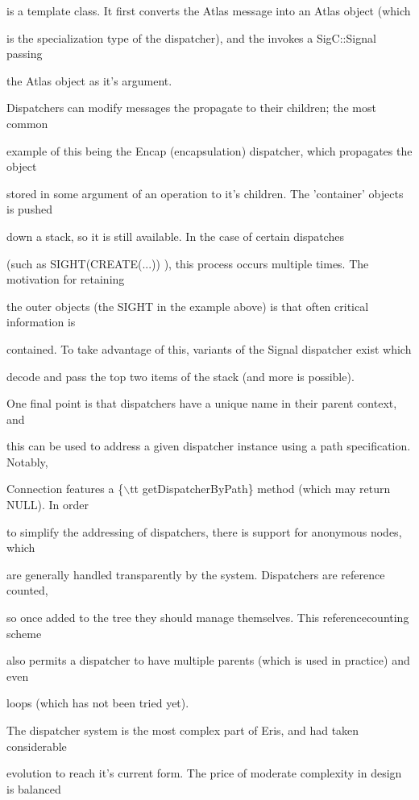 \documentclass[12pt]{article}
\begin{document}
is a template class. It first converts the Atlas message into an Atlas object (which

is the specialization type of the dispatcher), and the invokes a SigC::Signal passing

the Atlas object as it's argument.



Dispatchers can modify messages the propagate to their children; the most common

example of this being the Encap (encapsulation) dispatcher, which propagates the object

stored in some argument of an operation to it's children. The 'container' objects is pushed

down a stack, so it is still available. In the case of certain dispatches

(such as SIGHT(CREATE(...)) ), this process occurs multiple times. The motivation for retaining

the outer objects (the SIGHT in the example above) is that often critical information is

contained. To take advantage of this, variants of the Signal dispatcher exist which

decode and pass the top two items of the stack (and more is possible).



One final point is that dispatchers have a unique name in their parent context, and

this can be used to address a given dispatcher instance using a path specification. Notably,

Connection features a \{\ensuremath{\backslash}tt getDispatcherByPath\} method (which may return NULL). In order

to simplify the addressing of dispatchers, there is support for anonymous nodes, which

are generally handled transparently by the system. Dispatchers are reference counted,

so once added to the tree they should manage themselves. This referencecounting scheme

also permits a dispatcher to have multiple parents (which is used in practice) and even

loops (which has not been tried yet).



The dispatcher system is the most complex part of Eris, and had taken considerable

evolution to reach it's current form. The price of moderate complexity in design is balanced
\end{document}
